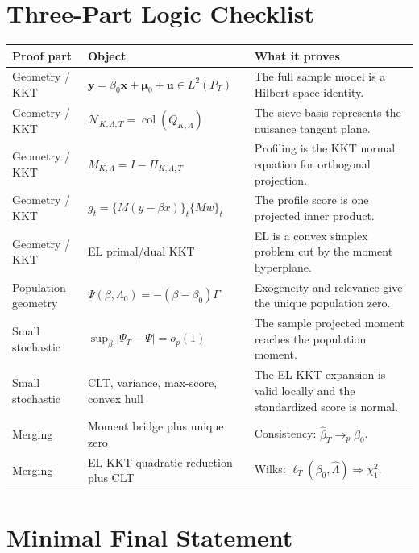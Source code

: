 \documentclass[12pt]{article}
\numberwithin{equation}{section}
\theoremstyle{definition}
\newcommand{\op}{o_p}
\newcommand{\N}{\mathcal N}
\newcommand{\LtwoT}{L^2(P_T)}
\begin{document}
\section{Three-Part Logic Checklist}

\begin{center}
\begin{tabular}{>{\raggedright\arraybackslash}p{}
                >{\raggedright\arraybackslash}p{}
                >{\raggedright\arraybackslash}p{}}
\toprule
Proof part & Object & What it proves \\
\midrule
Geometry / KKT &
\(\bm y=\beta_0\bm x+\bm\mu_0+\bm u\in\LtwoT\) &
The full sample model is a Hilbert-space identity. \\
\addlinespace
Geometry / KKT &
\(\N_{K,\Lambda,T}=\operatorname{col}(Q_{K,\Lambda})\) &
The sieve basis represents the nuisance tangent plane. \\
\addlinespace
Geometry / KKT &
\(M_{K,\Lambda}=I-\Pi_{K,\Lambda,T}\) &
Profiling is the KKT normal equation for orthogonal projection. \\
\addlinespace
Geometry / KKT &
\(g_t=\{M(y-\beta x)\}_t\{Mw\}_t\) &
The profile score is one projected inner product. \\
\addlinespace
Geometry / KKT &
EL primal/dual KKT &
EL is a convex simplex problem cut by the moment hyperplane. \\
\addlinespace
Population geometry &
\(\Psi(\beta,\Lambda_0)=-(\beta-\beta_0)\Gamma\) &
Exogeneity and relevance give the unique population zero. \\
\addlinespace
Small stochastic &
\(\sup_\beta|\Psi_T-\Psi|=\op(1)\) &
The sample projected moment reaches the population moment. \\
\addlinespace
Small stochastic &
CLT, variance, max-score, convex hull &
The EL KKT expansion is valid locally and the standardized score is normal. \\
\addlinespace
Merging &
Moment bridge plus unique zero &
Consistency: \(\widehat\beta_T\to_p\beta_0\). \\
\addlinespace
Merging &
EL KKT quadratic reduction plus CLT &
Wilks: \(\ell_T(\beta_0,\widehat\Lambda)\Rightarrow\chi_1^2\). \\
\bottomrule
\end{tabular}
\end{center}

\section{Minimal Final Statement}
\end{document}
